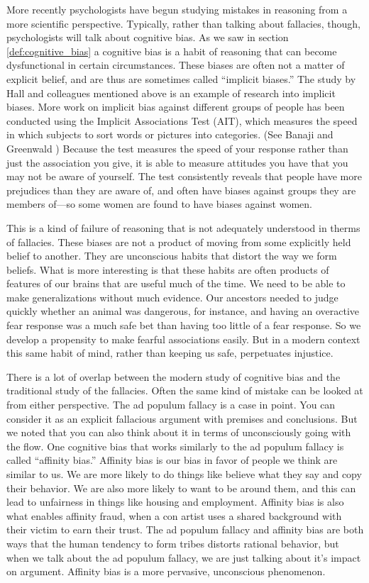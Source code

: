 More recently psychologists have begun studying mistakes in reasoning from a more scientific perspective. Typically, rather than talking about fallacies, though, psychologists will talk about cognitive bias. As we saw in section \ref{def:cognitive_bias} \label{cognitive_bias_detail} a cognitive bias is a habit of reasoning that can become dysfunctional in certain circumstances. These biases are often not a matter of explicit belief, and are thus are sometimes called ``implicit biases.'' The study by Hall and colleagues mentioned above is an example of research into implicit biases. More work on implicit bias against different groups of people has been conducted using  the Implicit Associations Test (AIT), which measures the speed in which subjects to sort words or pictures into categories. (See Banaji and Greenwald \cite*{Banaji2013}) Because the test measures the speed of your response rather than just the association you give, it is able to measure attitudes you have that you may not be aware of yourself. The test consistently reveals that people have more prejudices than they are aware of, and often have biases against groups they are members of---so some women are found to have biases against women. 

This is a kind of failure of reasoning that is not adequately understood in therms of fallacies. These biases are not a product of moving from some explicitly held belief to another. They are unconscious habits that distort the way we form beliefs. What is more interesting is that these habits are often products of features of our brains that are useful much of the time. We need to be able to make generalizations without much evidence. Our ancestors needed to judge quickly whether an animal was dangerous, for instance, and having an overactive fear response was a much safe bet than having too little of a fear response. So we develop a propensity to make fearful associations easily. But in a modern context this same habit of mind, rather than keeping us safe, perpetuates injustice. 

There is a lot of overlap between the modern study of cognitive bias and the traditional study of the fallacies. Often the same kind of mistake can be looked at from either perspective. The ad populum fallacy is a case in point. You can consider it as an explicit fallacious argument with premises and conclusions. But we noted that you can also think about it in terms of unconsciously  going with the flow. One cognitive bias that works similarly to the ad populum fallacy is called ``affinity bias.'' Affinity bias is our bias in favor of people we think are similar to us. We are more likely to do things like believe what they say and copy their behavior. We are also more likely to want to be around them, and this can lead to unfairness in things like housing and employment. Affinity bias is also what enables affinity fraud, when a con artist uses a shared background with their victim to earn their trust. The ad populum fallacy and affinity bias are both ways that the human tendency to form tribes distorts rational behavior, but when we talk about the ad populum fallacy, we are just talking about it's impact on argument. Affinity bias is a more pervasive, unconscious phenomenon. 


